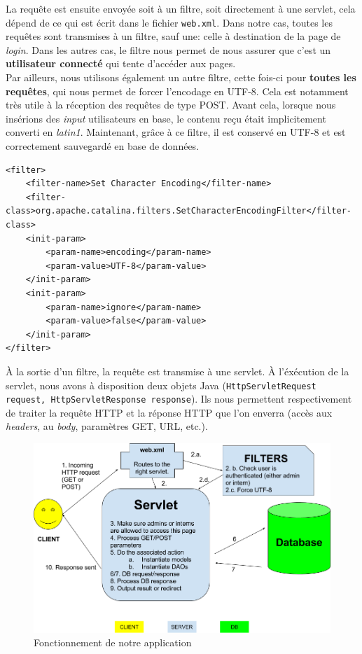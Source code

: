 La requête est ensuite envoyée soit à un filtre, soit directement à une servlet, cela dépend de ce qui est écrit dans le fichier \lstinline{web.xml}. Dans notre cas, toutes les requêtes sont transmises à un filtre, sauf une: celle à destination de la page de \textit{login}. Dans les autres cas, le filtre nous permet de nous assurer que c'est un \textbf{utilisateur connecté} qui tente d'accéder aux pages.\\
Par ailleurs, nous utilisons également un autre filtre, cette fois-ci pour \textbf{toutes les requêtes}, qui nous permet de forcer l'encodage en UTF-8. Cela est notamment très utile à la réception des requêtes de type POST. Avant cela, lorsque nous insérions des \textit{input} utilisateurs en base, le contenu reçu était implicitement converti en \textit{latin1}. Maintenant, grâce à ce filtre, il est conservé en UTF-8 et est correctement sauvegardé en base de données.

\xml
\begin{lstlisting}
<filter>
    <filter-name>Set Character Encoding</filter-name>
	<filter-class>org.apache.catalina.filters.SetCharacterEncodingFilter</filter-class>
	<init-param>
		<param-name>encoding</param-name>
		<param-value>UTF-8</param-value>
	</init-param>
	<init-param>
		<param-name>ignore</param-name>
		<param-value>false</param-value>
	</init-param>
</filter>
\end{lstlisting}

\java

À la sortie d'un filtre, la requête est transmise à une servlet. À l'éxécution de la servlet, nous avons à disposition deux objets Java (\lstinline{HttpServletRequest request, HttpServletResponse response}). Ils nous permettent respectivement de traiter la requête HTTP et la réponse HTTP que l'on enverra (accès aux \textit{headers}, au \textit{body}, paramètres GET, URL, etc.).

\begin{figure}[h]
    \centering\includegraphics[width=1.00\textwidth]{images/arch.png}
    \caption{Fonctionnement de notre application}
\end{figure}

